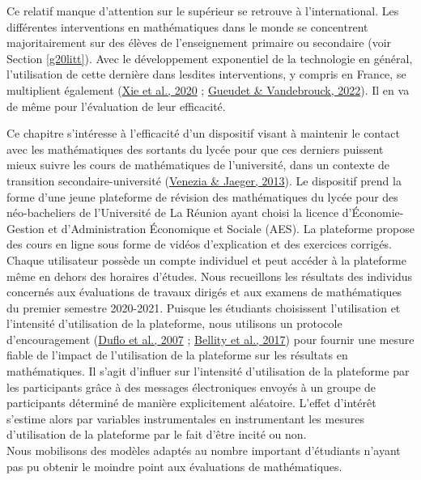 \documentclass[
]{book}
\begin{document}
Ce relatif manque d'attention sur le supérieur se retrouve à l'international. Les différentes interventions en mathématiques dans le monde se concentrent majoritairement sur des élèves de l'enseignement primaire ou secondaire (voir Section \ref{g20litt}). Avec le développement exponentiel de la technologie en général, l'utilisation de cette dernière dans lesdites interventions, y compris en France, se multiplient également (\protect\hyperlink{ref-XIE:eal:20}{Xie et al., 2020} ; \protect\hyperlink{ref-GUE:VAN:22}{Gueudet \& Vandebrouck, 2022}). Il en va de même pour l'évaluation de leur efficacité.

\quad Ce chapitre s'intéresse à l'efficacité d'un dispositif visant à maintenir le contact avec les mathématiques des sortants du lycée pour que ces derniers puissent mieux suivre les cours de mathématiques de l'université, dans un contexte de transition secondaire-université (\protect\hyperlink{ref-VEN:JAE:13}{Venezia \& Jaeger, 2013}). Le dispositif prend la forme d'une jeune plateforme de révision des mathématiques du lycée pour des néo-bacheliers de l'Université de La Réunion ayant choisi la licence d'Économie-Gestion et d'Administration Économique et Sociale (AES). La plateforme propose des cours en ligne sous forme de vidéos d'explication et des exercices corrigés. Chaque utilisateur possède un compte individuel et peut accéder à la plateforme même en dehors des horaires d'études. Nous recueillons les résultats des individus concernés aux évaluations de travaux dirigés et aux examens de mathématiques du premier semestre 2020-2021. Puisque les étudiants choisissent l'utilisation et l'intensité d'utilisation de la plateforme, nous utilisons un protocole d'encouragement (\protect\hyperlink{ref-DUF:eal:07}{Duflo et al., 2007} ; \protect\hyperlink{ref-BEL:eal:17}{Bellity et al., 2017}) pour fournir une mesure fiable de l'impact de l'utilisation de la plateforme sur les résultats en mathématiques. Il s'agit d'influer sur l'intensité d'utilisation de la plateforme par les participants grâce à des messages électroniques envoyés à un groupe de participants déterminé de manière explicitement aléatoire. L'effet d'intérêt s'estime alors par variables instrumentales en instrumentant les mesures d'utilisation de la plateforme par le fait d'être incité ou non.\\
Nous mobilisons des modèles adaptés au nombre important d'étudiants n'ayant pas pu obtenir le moindre point aux évaluations de mathématiques.
\end{document}
